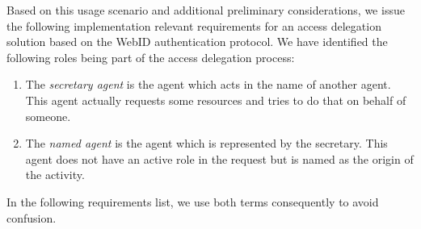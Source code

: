 \documentclass[a4paper]{llncs}
\begin{document}




Based on this usage scenario and additional preliminary considerations, we issue the following implementation relevant requirements for an access delegation solution based on the WebID authentication protocol.
We have identified the following roles being part of the access delegation process:
\begin{enumerate}
    \item The \textit{secretary agent} is the agent which acts in the name of another agent.
This agent actually requests some resources and tries to do that on behalf of someone.
    \item The \textit{named agent} is the agent which is represented by the secretary.
This agent does not have an active role in the request but is named as the origin of the activity.
\end{enumerate}
In the following requirements list, we use both terms consequently to avoid confusion.
\end{document}

